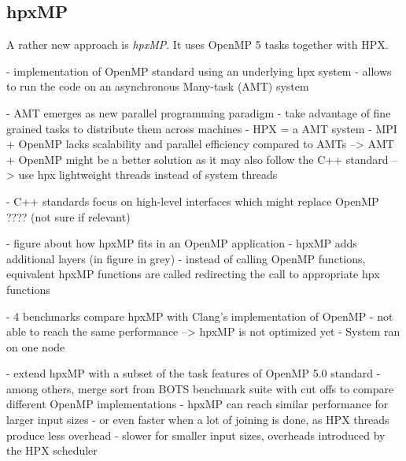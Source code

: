   
\subsection{hpxMP}



  A rather new approach is \textit{hpxMP}.
  It uses OpenMP 5 tasks together with HPX.  
  
  
\cite{hpxMP.2019}
  - implementation of OpenMP standard using an underlying hpx system
  - allows to run the code on an asynchronous Many-task (AMT) system
  
  - AMT emerges as new parallel programming paradigm
  - take advantage of fine grained tasks to distribute them across machines
  - HPX = a AMT system
  - MPI + OpenMP lacks scalability and parallel efficiency compared to AMTs
    --> AMT + OpenMP might be a better solution as it may also follow the C++ standard
    --> use hpx lightweight threads instead of system threads
  
  - C++ standards focus on high-level interfaces which might replace OpenMP ???? (not sure if relevant)
  
  - figure about how hpxMP fits in an OpenMP application
  - hpxMP adds additional layers (in figure in grey)
  - instead of calling OpenMP functions, equivalent hpxMP functions are called redirecting the call to appropriate hpx functions
  
  - 4 benchmarks compare hpxMP with Clang's implementation of OpenMP
  - not able to reach the same performance --> hpxMP is not optimized yet
  - System ran on one node


\cite{Zhang.2192020}
 - extend hpxMP with a subset of the task features of OpenMP 5.0 standard
 - among others, merge sort from BOTS benchmark suite with cut offs to compare different OpenMP implementations
 - hpxMP can reach similar performance for larger input sizes 
   - or even faster when a lot of joining is done, as HPX threads produce less overhead
 - slower for smaller input sizes, overheads introduced by the HPX scheduler


    
